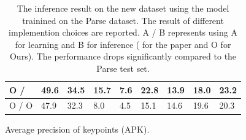 \documentclass[10pt,twocolumn,letterpaper]{article}
\begin{document}
\begin{table}[t]
\begin{center}
\begin{tabular}{|p{1.1cm}|p{0.5cm}|p{0.5cm}|p{0.5cm}|p{0.5cm}|p{0.5cm}|p{0.5cm}|p{0.5cm}||p{0.5cm}|}
      O / \cite{Yang_PAMI2011}			 	 & 49.6 & 34.5 & 15.7 &  7.6 & 22.8 & 13.9 & 18.0 & 23.2 \\ \hline
      O / O			 			 & 47.9 & 32.3 &  8.0 &  4.5 & 15.1 & 14.6 & 19.6 & 20.3 \\ \hline
    \end{tabular}
    \caption*{Average precision of keypoints (APK).}
  \end{center}
  \caption{The inference result on the new dataset using the model trainined on the Parse dataset. The result of different implemention choices are reported. A / B represents using A for learning and B for inference (\cite{Yang_PAMI2011} for the paper and O for Ours). The performance drops significantly compared to the Parse test set.}
  \label{tab:newdata_acc}
\end{table} 
\end{document}
